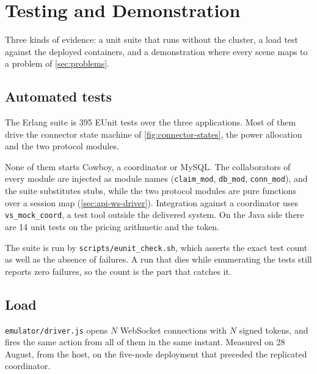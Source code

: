 \section{Testing and Demonstration}
\label{sec:testing}

Three kinds of evidence: a unit suite that runs without the cluster, a load test against
the deployed containers, and a demonstration where every scene maps to a problem of
\cref{sec:problems}.

\subsection{Automated tests}
\label{sec:tests-unit}

The Erlang suite is 395 EUnit tests over the three applications. Most of them drive the
connector state machine of \cref{fig:connector-states}, the power allocation and the two
protocol modules.

None of them starts Cowboy, a coordinator or MySQL. The collaborators of every module are
injected as module names (\texttt{claim\_mod}, \texttt{db\_mod}, \texttt{conn\_mod}), and
the suite substitutes stubs, while the two protocol modules are pure functions over a
session map (\cref{sec:api-ws-driver}). Integration against a coordinator uses
\texttt{vs\_mock\_coord}, a test tool outside the delivered system. On the Java side there
are 14 unit tests on the pricing arithmetic and the token.

The suite is run by \texttt{scripts/eunit\_check.sh}, which asserts the exact test count
as well as the absence of failures. A run that dies while enumerating the tests still
reports zero failures, so the count is the part that catches it.

\subsection{Load}
\label{sec:tests-load}

\texttt{emulator/driver.js} opens $N$ WebSocket connections with $N$ signed tokens, and
fires the same action from all of them in the same instant. Measured on 28 August, from the
host, on the five-node deployment that preceded the replicated coordinator.

